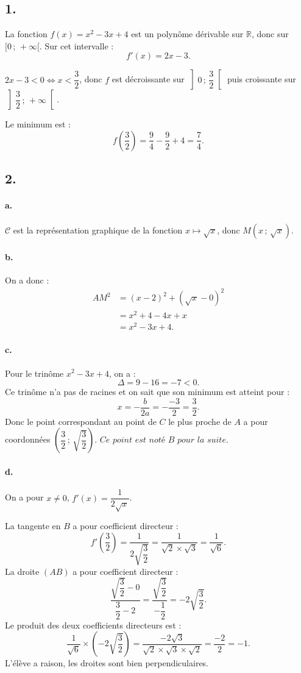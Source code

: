 \subsection*{1.}

La fonction \( f(x) = x^2 - 3x + 4 \) est un polynôme dérivable sur \( \mathbb{R} \), donc sur \( [0\,;\,+\infty[ \). Sur cet intervalle :
\[
f'(x) = 2x - 3.
\]

\(2x - 3 < 0 \iff x < \dfrac{3}{2}\), donc \(f\) est décroissante sur \( \left]0\,;\,\dfrac{3}{2} \right[\) puis croissante sur \( \left]\dfrac{3}{2}\,;\,+\infty \right[ \).

Le minimum est :
\[
f\left(\dfrac{3}{2}\right) = \dfrac{9}{4} - \dfrac{9}{2} + 4 = \dfrac{7}{4}.
\]

\subsection*{2.}

\paragraph{a.} \(\mathcal{C}\) est la représentation graphique de la fonction \(x \longmapsto \sqrt{x}\), donc \( M(x \,;\, \sqrt{x}) \).

\paragraph{b.} On a donc :
\begin{align*}
AM^2 &= (x - 2)^2 + (\sqrt{x} - 0)^2 \\
&= x^2 + 4 - 4x + x \\
&= x^2 - 3x + 4.
\end{align*}

\paragraph{c.} Pour le trinôme \(x^2 - 3x + 4\), on a :
\[
\Delta = 9 - 16 = -7 < 0.
\]
Ce trinôme n'a pas de racines et on sait que son minimum est atteint pour :
\[
x = -\dfrac{b}{2a} = -\dfrac{-3}{2} = \dfrac{3}{2}.
\]
Donc le point correspondant au point de \(C\) le plus proche de \(A\) a pour coordonnées \( \left( \dfrac{3}{2} \,;\, \sqrt{\dfrac{3}{2}} \right).  \textit{ Ce point est noté } B \textit{ pour la suite}\).

\paragraph{d.} On a pour \(x \neq 0\), \(f'(x) = \dfrac{1}{2\sqrt{x}}\).

La tangente en \(B\) a pour coefficient directeur :
\[
f'\left( \dfrac{3}{2} \right) = \dfrac{1}{2 \sqrt{\dfrac{3}{2}}} = \dfrac{1}{\sqrt{2} \times \sqrt{3}} = \dfrac{1}{\sqrt{6}}.
\]
La droite \((AB)\) a pour coefficient directeur :
\[
\dfrac{\sqrt{\dfrac{3}{2}} - 0}{\dfrac{3}{2} - 2} = \dfrac{\sqrt{\dfrac{3}{2}}}{-\dfrac{1}{2}} = -2 \sqrt{\dfrac{3}{2}}.
\]
Le produit des deux coefficients directeurs est :
\[
\dfrac{1}{\sqrt{6}} \times \left( -2 \sqrt{\dfrac{3}{2}} \right) = \dfrac{-2\sqrt{3}}{\sqrt{2} \times \sqrt{3} \times \sqrt{2}} = \dfrac{-2}{2} = -1.
\]
L'élève a raison, les droites sont bien perpendiculaires.
